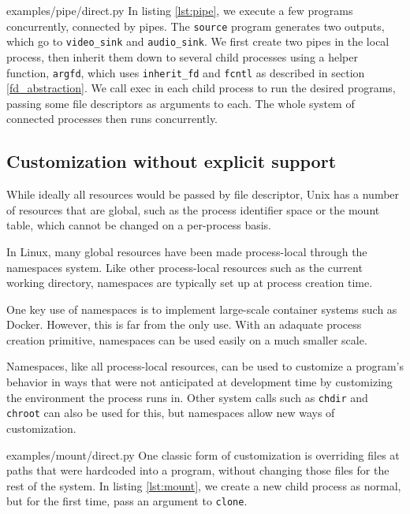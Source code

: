 \documentclass[letterpaper,twocolumn,10pt]{article}
\begin{document}

{examples/pipe/direct.py}
In listing \ref{lst:pipe},
we execute a few programs concurrently,
connected by pipes.
The \texttt{source} program generates two outputs, which go to \texttt{video\_sink} and \texttt{audio\_sink}.
We first create two pipes in the local process,
then inherit them down to several child processes using a helper function, \verb|argfd|,
which uses \verb|inherit_fd| and \texttt{fcntl} as described in section \ref{fd_abstraction}.
We call exec in each child process to run the desired programs,
passing some file descriptors as arguments to each.
The whole system of connected processes then runs concurrently.
\subsection{Customization without explicit support}
While ideally all resources would be passed by file descriptor,
Unix has a number of resources that are global,
such as the process identifier space or the mount table,
which cannot be changed on a per-process basis.\cite{capsicum}

In Linux, many global resources have been made process-local
through the namespaces system.\cite{lwn_namespaces}
Like other process-local resources such as the current working directory,
namespaces are typically set up at process creation time.

One key use of namespaces is to implement large-scale container systems such as Docker.\cite{lwn_namespaces}
However, this is far from the only use.
With an adaquate process creation primitive,
namespaces can be used easily on a much smaller scale.

Namespaces, like all process-local resources,
can be used to customize a program's behavior
in ways that were not anticipated at development time
by customizing the environment the process runs in.\cite{plan9ns}
Other system calls such as \texttt{chdir} and \texttt{chroot} can also be used for this,
but namespaces allow new ways of customization.\cite{mount_namespaces}


{examples/mount/direct.py}
One classic form of customization
is overriding files at paths that were hardcoded into a program,
without changing those files for the rest of the system.
In listing \ref{lst:mount},
we create a new child process as normal,
but for the first time,
pass an argument to \texttt{clone}.
\end{document}
